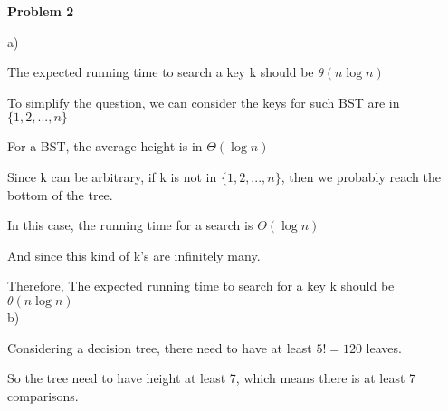 \documentclass[12pt]{article}
\begin{document}
	
	\begin{center}
		{\Large\bf Problem 2}\\
		\vspace{3mm}
	\end{center}
	
	\def\question#1{\item[\bf #1.]}
	\def\part#1{\item[\bf #1)]}
	\newcommand{\pc}[1]{\mbox{\textbf{#1}}} %
	
	
	
	a)
	
	The expected running time to search a key k should be $ \theta(n \log n)$
	
	To simplify the question, we can consider the keys for such BST are in $\{1,2,... ,n\}$
	
	For a BST, the average height is in $\Theta(\log n)$
	
	Since k can be arbitrary, if k is not in $\{1,2,... ,n\}$, then we probably reach the bottom of the tree.
	
	In this case, the running time for a search is $\Theta(\log n)$
	
	And since this kind of k's are infinitely many.
	
	Therefore, The expected running time to search for a key k should be $\theta(n \log n)$\\
	
	b)
	
	Considering a decision tree, there need to have at least $5! = 120$ leaves.
	
	So the tree need to have height at least 7, which means there is at least 7 comparisons.
	
	
	
\end{document}
